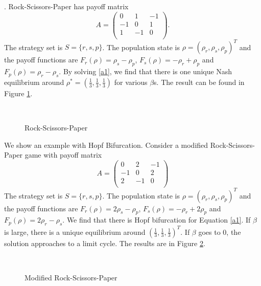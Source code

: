 \documentclass[11pt,reqno]{amsart}
\begin{document}
. 
Rock-Scissors-Paper has payoff matrix
\begin{equation*}
A=\begin{pmatrix}
0&1&-1\\
-1&0&1\\
1&-1&0\\
\end{pmatrix}.
\end{equation*}
The strategy set is $S=\{r, s, p\}$. The population state is
$\rho=(\rho_r,\rho_s,\rho_p)^T$ and the payoff functions are $F_r(\rho)=\rho_s-\rho_p$, $F_s(\rho)=-\rho_r+\rho_p$ and $F_p(\rho)=\rho_r-\rho_s$. By solving \eqref{a1}, we find that there is one unique Nash equilibrium  around $\rho^*=(\frac{1}{3},
\frac{1}{3}, \frac{1}{3})$ for various $\beta$s. The result can be found in Figure \ref{Rock-Scissors-Paper}. 
\begin{figure}[H]
 \hspace{1cm}
 \\
\caption{Rock-Scissors-Paper}
\label{Rock-Scissors-Paper}
\end{figure}

We show an example with Hopf Bifurcation. Consider a modified Rock-Scissors-Paper game with payoff matrix
\begin{equation*}
A=\begin{pmatrix}
0&2&-1\\
-1&0&2\\
2&-1&0\\
\end{pmatrix}
\end{equation*}
The strategy set is $S=\{r, s, p\}$. The population state is
$\rho=(\rho_r,\rho_s,\rho_p)^T$ and the payoff functions are
$F_r(\rho)=2\rho_s-\rho_p$, $F_s(\rho)=-\rho_r+2\rho_p$ and
$F_p(\rho)=2\rho_r-\rho_s$. We find that there is Hopf bifurcation for Equation
\eqref{a1}. If $\beta$ is large, there is a unique equilibrium
around $(\frac{1}{3}, \frac{1}{3}, \frac{1}{3})^T$. If $\beta$ goes to $0$,
the solution approaches to a limit cycle. The results are in Figure \ref{Bad-Rock-Scissors-Paper}. 
\begin{figure}[H]
 \\
\caption{Modified Rock-Scissors-Paper}
\label{Bad-Rock-Scissors-Paper}
\end{figure}
\end{document}
